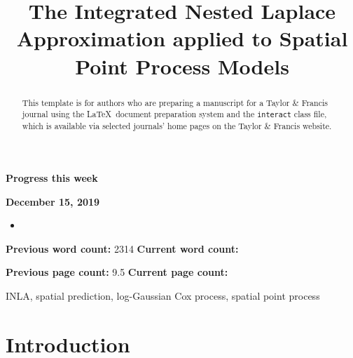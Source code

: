 \documentclass[]{interact}
\begin{document}
{\Large\bf Progress this week}

{\large\bf December 15, 2019}

\begin{itemize}

\item 

\end{itemize}

\vfill

\textbf{Previous word count:} 2314 \hfill \textbf{Current word count:} 

\textbf{Previous page count:} 9.5 \hfill \textbf{Current page count:} 

\pagebreak


\title{The Integrated Nested Laplace Approximation applied to Spatial Point Process Models}

\author{
}

\maketitle

\begin{abstract}
This template is for authors who are preparing a manuscript for a Taylor \& Francis journal using the \LaTeX\ document preparation system and the \texttt{interact} class file, which is available via selected journals' home pages on the Taylor \& Francis website.
\end{abstract}

\begin{keywords}
INLA, spatial prediction, log-Gaussian Cox process, spatial point process
\end{keywords}


\section{Introduction}

\end{document}
